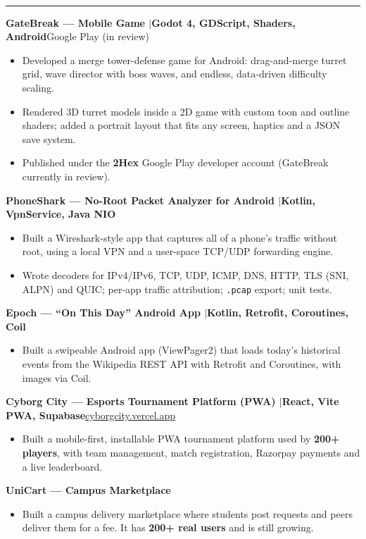 \documentclass[10pt,a4paper]{article}
\renewcommand{\section}[1]{\vspace{6pt}{\large\bfseries\MakeUppercase{#1}}\\[-7pt]\rule{\textwidth}{0.6pt}\vspace{2pt}}
\newcommand{\entry}[2]{\par\textbf{#1}\hfill #2\par}
\newenvironment{points}{\vspace{-4pt}\begin{itemize}\setlength{\itemsep}{0pt}\setlength{\parskip}{0pt}\setlength{\topsep}{0pt}\setlength{\partopsep}{0pt}\setlength{\leftmargin}{12pt}}{\end{itemize}\vspace{-2pt}}
\newcommand{\sep}{\enspace$|$\enspace}
\begin{document}
\section{Projects}
\entry{GateBreak --- Mobile Game \textnormal{\sep Godot 4, GDScript, Shaders, Android}}{Google Play (in review)}
\begin{points}
  \item Developed a merge tower-defense game for Android: drag-and-merge turret grid, wave director with boss waves, and endless, data-driven difficulty scaling.
  \item Rendered 3D turret models inside a 2D game with custom toon and outline shaders; added a portrait layout that fits any screen, haptics and a JSON save system.
  \item Published under the \textbf{2Hex} Google Play developer account (GateBreak currently in review).
\end{points}
\entry{PhoneShark --- No-Root Packet Analyzer for Android \textnormal{\sep Kotlin, VpnService, Java NIO}}{}
\begin{points}
  \item Built a Wireshark-style app that captures all of a phone's traffic without root, using a local VPN and a user-space TCP/UDP forwarding engine.
  \item Wrote decoders for IPv4/IPv6, TCP, UDP, ICMP, DNS, HTTP, TLS (SNI, ALPN) and QUIC; per-app traffic attribution; \texttt{.pcap} export; unit tests.
\end{points}
\entry{Epoch --- ``On This Day'' Android App \textnormal{\sep Kotlin, Retrofit, Coroutines, Coil}}{}
\begin{points}
  \item Built a swipeable Android app (ViewPager2) that loads today's historical events from the Wikipedia REST API with Retrofit and Coroutines, with images via Coil.
\end{points}
\entry{Cyborg City --- Esports Tournament Platform (PWA) \textnormal{\sep React, Vite PWA, Supabase}}{\href{https://cyborgcity.vercel.app}{cyborgcity.vercel.app}}
\begin{points}
  \item Built a mobile-first, installable PWA tournament platform used by \textbf{200+ players}, with team management, match registration, Razorpay payments and a live leaderboard.
\end{points}
\entry{UniCart --- Campus Marketplace}{}
\begin{points}
  \item Built a campus delivery marketplace where students post requests and peers deliver them for a fee. It has \textbf{200+ real users} and is still growing.
\end{points}
\end{document}
